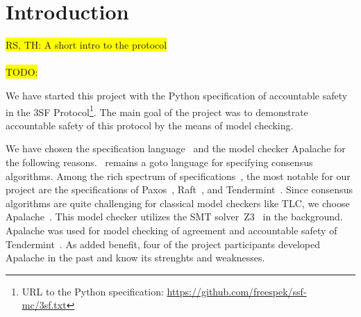 
\section{Introduction}

\colorbox{yellow}{RS, TH: A short intro to the protocol}

\paragraph{}\colorbox{yellow}{TODO:}

We have started this project with the Python specification of accountable
safety in the 3SF Protocol\footnote{URL to the Python specification:
\url{https://github.com/freespek/ssf-mc/3sf.txt}}. The main goal of the project
was to demonstrate accountable safety of this protocol by the means of model
checking.

We have chosen the specification language~\tlap{} and the model checker
Apalache for the following reasons.\ \tlap{} remains a goto language for
specifying consensus algorithms. Among the rich spectrum of
specifications~\cite{tla-examples}, the most notable for our project are the
specifications of Paxos~\cite{lamport2001paxos}, Raft~\cite{Ongaro14}, and
Tendermint~\cite{abs-1807-04938,TendermintSpec2020}. Since consensus algorithms
are quite challenging for classical model checkers like TLC, we choose
Apalache~\cite{Apalache2024,KT19,KonnovKM22}. This model checker utilizes the
SMT solver~Z3~\cite{MouraB08} in the background. Apalache was used for model
checking of agreement and accountable safety of
Tendermint~\cite{TendermintSpec2020}. As added benefit, four of the project
participants developed Apalache in the past and know its strenghts and
weaknesses.

